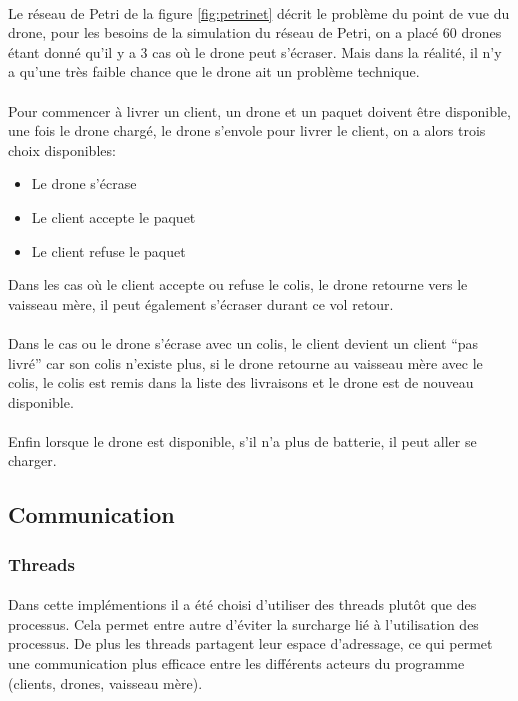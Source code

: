 \documentclass[article, backcover, french, nodocumentinfo]{upmethodology-document}
\begin{document}
			\paragraph*{}
				Le réseau de Petri de la figure \ref{fig:petrinet} décrit le problème du point de vue du drone, pour les besoins de la
				simulation du réseau de Petri, on a placé 60 drones étant donné qu'il y a 3
				cas où le drone peut s'écraser. Mais dans la réalité, il n'y a qu'une très
				faible chance que le drone ait un problème technique.
			\paragraph*{}
				Pour commencer à livrer un client, un drone et un paquet doivent être
				disponible, une fois le drone chargé, le drone s'envole pour livrer le
				client, on a alors trois choix disponibles:
				\begin{itemize}
					\item Le drone s'écrase
					\item Le client accepte le paquet
					\item Le client refuse le paquet
				\end{itemize}
				Dans les cas où le client accepte ou refuse le colis, le drone retourne vers le vaisseau mère,
				il peut également s'écraser	durant ce vol retour.
			\paragraph*{}
				Dans le cas ou le drone s'écrase avec un colis, le client
				devient un client ``pas livré'' car son colis n'existe plus, si le drone
				retourne au vaisseau mère avec le colis, le colis est remis dans la liste
				des livraisons et le drone est de nouveau disponible.
			\paragraph*{}
				Enfin lorsque le drone est disponible, s'il n'a plus de batterie, il peut
				aller se charger.
		\subsection{Communication}
			\subsubsection{Threads}
				\paragraph*{}
					Dans cette implémentions il a été choisi d'utiliser des threads plutôt que des processus.
					Cela permet entre autre d'éviter la surcharge lié à l'utilisation des processus.
					De plus les threads partagent leur espace d'adressage, ce qui permet une communication
					plus efficace entre les différents acteurs du programme (clients, drones, vaisseau mère).
\end{document}
